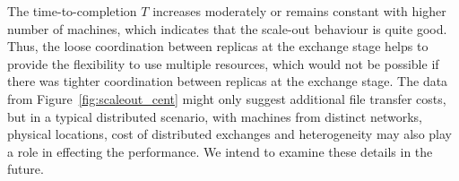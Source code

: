 \documentclass{rspublic}
\newcommand{\alnote}[1]{ {\textcolor{blue} { ***andre: #1 }}}
\newcommand{\alnote}[1]{}
\begin{document}
The time-to-completion $T$ increases
moderately or remains constant with higher number of machines, which
indicates that the scale-out behaviour is quite good.  %
Thus, the loose coordination between replicas at the exchange stage helps to 
provide the flexibility to use multiple resources, which would not be possible if
there was tighter coordination between replicas at the exchange stage. The data from Figure~\ref{fig:scaleout_cent} might only suggest additional file transfer costs, but in a typical distributed scenario, with machines from distinct networks, physical locations, cost of distributed exchanges and heterogeneity may also play a role in effecting the performance. We intend to examine these details in the future.







\end{document}
